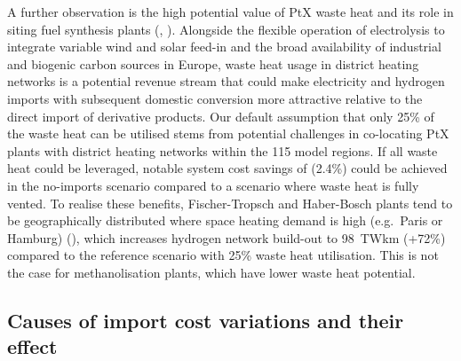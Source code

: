 
A further observation is the high potential value of PtX waste heat and its role
in siting fuel synthesis plants (,
). Alongside the flexible operation of electrolysis to
integrate variable wind and solar feed-in and the broad availability of
industrial and biogenic carbon sources in Europe, waste heat usage in district
heating networks is a potential revenue stream that could make electricity and
hydrogen imports with subsequent domestic conversion more attractive relative to
the direct import of derivative products. Our default assumption that only 25\%
of the waste heat can be utilised stems from potential challenges in co-locating
PtX plants with district heating networks within the 115 model regions. If all
waste heat could be leveraged, notable system cost savings of 
(2.4\%) could be achieved in the no-imports scenario compared to a scenario
where waste heat is fully vented. To realise these benefits, Fischer-Tropsch and
Haber-Bosch plants tend to be geographically distributed where space heating
demand is high (e.g.~Paris or Hamburg) (), which
increases hydrogen network build-out to 98~TWkm (+72\%) compared to the
reference scenario with 25\% waste heat utilisation. This is not the case for
methanolisation plants, which have lower waste heat potential.

\subsection*{Causes of import cost variations and their effect}
\label{sec:results-7}

